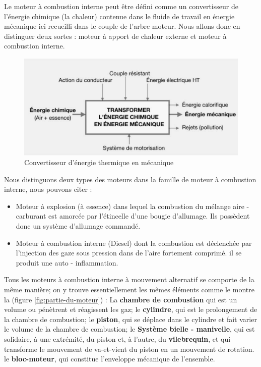 Le moteur à combustion interne peut être défini comme un convertisseur de l'énergie chimique (la chaleur) contenue dans le fluide de travail en énergie mécanique ici recueilli dans le couple de l'arbre moteur. Nous allons donc en distinguer deux sortes : moteur à apport de chaleur externe et moteur à combustion interne.\cite{sumuna}
\begin{figure}[h]
	\centering
	\includegraphics[width=0.7\linewidth]{Img/convertisseur}
	\caption[Convertisseur]{Convertisseur d'énergie thermique en mécanique}
	\label{fig:convertisseur}
\end{figure}
Nous  distinguons deux types des moteurs dans la famille de moteur à combustion interne, nous pouvons citer :
\begin{itemize}
	\item Moteur à explosion (à essence) dans lequel la combustion du mélange aire - carburant est amorcée par l'étincelle d'une bougie d'allumage. Ils possèdent donc un système d'allumage commandé.\cite{tecauto}
	\item Moteur à combustion interne (Diesel) dont la combustion est déclenchée par l'injection des gaze sous pression dans de l'aire fortement comprimé. il se produit une auto - inflammation.\cite{tecauto}
\end{itemize}
Tous les moteurs à combustion interne à mouvement alternatif se comporte de la même manière; on y trouve essentiellement les mêmes éléments comme le montre la (figure \ref{fig:partie-du-moteur}) : La \textbf{chambre de combustion} qui est un volume ou pénètrent et réagissent les gaz; le \textbf{cylindre}, qui est le prolongement de la chambre de combustion; le \textbf{piston}, qui se déplace dans le cylindre et fait varier le volume de la chambre de combustion; le \textbf{Système bielle - manivelle}, qui est solidaire, à une extrémité, du piston et, à l’autre, du \textbf{vilebrequin}, et qui transforme le mouvement de va-et-vient du piston en un mouvement de rotation. le \textbf{bloc-moteur}, qui constitue l’enveloppe mécanique de l’ensemble.\cite{approche}\\

